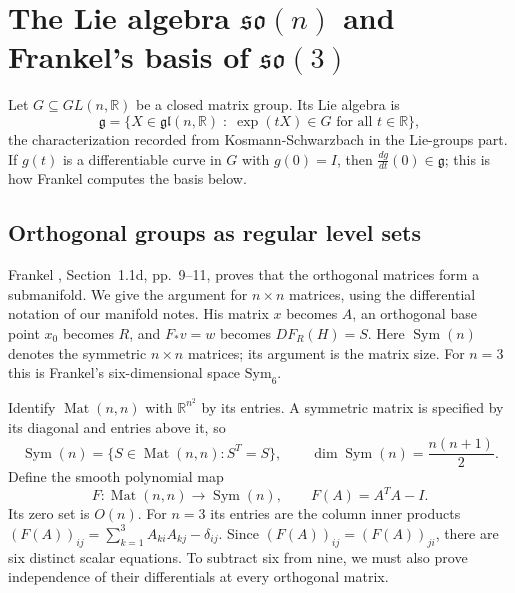 \section{The Lie algebra \texorpdfstring{$\mathfrak{so}(n)$}{so(n)} and Frankel's basis of \texorpdfstring{$\mathfrak{so}(3)$}{so(3)}}\label{quat:sec:so-n}
Let $G\subseteq GL(n,\mathbb R)$ be a closed matrix group. Its Lie algebra is
\begin{equation}\label{quat:matrix-lie-algebra}
 \mathfrak g=\{X\in\mathfrak{gl}(n,\mathbb R)\;:\;\exp(tX)\in G
 \text{ for all } t\in\mathbb R\},
\end{equation}
the characterization recorded from Kosmann-Schwarzbach in the Lie-groups
part. If $g(t)$ is a differentiable curve in $G$ with $g(0)=I$, then
$\frac{dg}{dt}(0)\in\mathfrak g$; this is how Frankel computes the basis
below.

\subsection{Orthogonal groups as regular level sets}\label{quat:sec:orthogonal-submanifold}
Frankel \cite{TFrankel2012}, Section~1.1d, pp.~9--11, proves that the
orthogonal matrices form a submanifold. We give the argument for $n\times n$
matrices, using the differential notation of our manifold notes. His
matrix $x$ becomes $A$, an orthogonal base point $x_0$ becomes $R$, and
$F_*v=w$ becomes $DF_R(H)=S$. Here $\operatorname{Sym}(n)$ denotes
the symmetric $n\times n$ matrices; its argument is the matrix size.
For $n=3$ this is Frankel's six-dimensional space $\mathrm{Sym}_6$.

Identify $\operatorname{Mat}(n,n)$ with $\mathbb R^{n^2}$ by its entries.
A symmetric matrix is specified by its diagonal and entries above it, so
\begin{equation}\label{quat:symmetric-dimension}
 \operatorname{Sym}(n)=\{S\in\operatorname{Mat}(n,n):S^T=S\},
 \qquad \dim\operatorname{Sym}(n)=\frac{n(n+1)}2.
\end{equation}
Define the smooth polynomial map
\begin{equation}\label{quat:orthogonality-map}
 F:\operatorname{Mat}(n,n)\longrightarrow\operatorname{Sym}(n),
 \qquad F(A)=A^TA-I.
\end{equation}
Its zero set is $O(n)$. For $n=3$ its entries are the column inner products
$(F(A))_{ij}=\sum_{k=1}^3 A_{ki}A_{kj}-\delta_{ij}$.
Since $(F(A))_{ij}=(F(A))_{ji}$, there are six distinct scalar equations.
To subtract six from nine, we must also prove independence of their
differentials at every orthogonal matrix.


